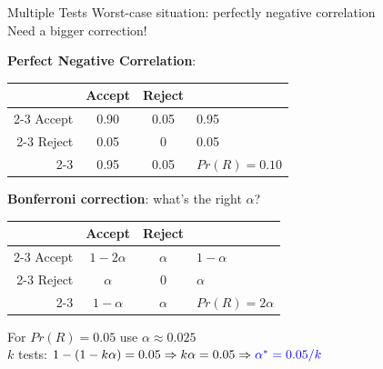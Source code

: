 \begin{frame}{Multiple Tests}
Worst-case situation: perfectly negative correlation\\
Need a bigger correction!
\begin{center}
    \textbf{Perfect Negative Correlation}:\\
     \begin{tabular}{r|c|c|l}
          \multicolumn{1}{r}{ } & \multicolumn{1}{c}{Accept} & \multicolumn{1}{c}{Reject} & \\
          \cline{2-3}
           Accept & {\color{olive}0.90} & {\color{red} 0.05} & 0.95 \\
          \cline{2-3}
          Reject & {\color{red} 0.05} & {\color{red} 0} & 0.05 \\
          \cline{2-3}
          \multicolumn{1}{r}{ }  & \multicolumn{1}{c}{0.95}  & \multicolumn{1}{c}{0.05} &  {\color{red}$Pr(R)=0.10$}
     \end{tabular}
\end{center}
{\color{blue}\textbf{Bonferroni correction}}: what's the right $\alpha$?
\begin{center}
     \begin{tabular}{r|c|c|l}
          \multicolumn{1}{r}{ } & \multicolumn{1}{c}{Accept} & \multicolumn{1}{c}{Reject} & \\
          \cline{2-3}
           Accept & {\color{olive}$1-2\alpha$} & {\color{red} $\alpha$} & $1-\alpha$ \\
          \cline{2-3}
          Reject & {\color{red} $\alpha$} & {\color{red} $0$} & $\alpha$ \\
          \cline{2-3}
          \multicolumn{1}{r}{ }  & \multicolumn{1}{c}{$1-\alpha$}  & \multicolumn{1}{c}{$\alpha$} &  {\color{red}$Pr(R)=2\alpha$}
     \end{tabular}
\end{center}
For $Pr(R)=0.05$ use $\alpha \approx 0.025$\\
$k$ tests: $1-(1-k\alpha)=0.05 \Rightarrow k\alpha=0.05\Rightarrow {\color{blue}\alpha^*=0.05/k}$
\end{frame}


